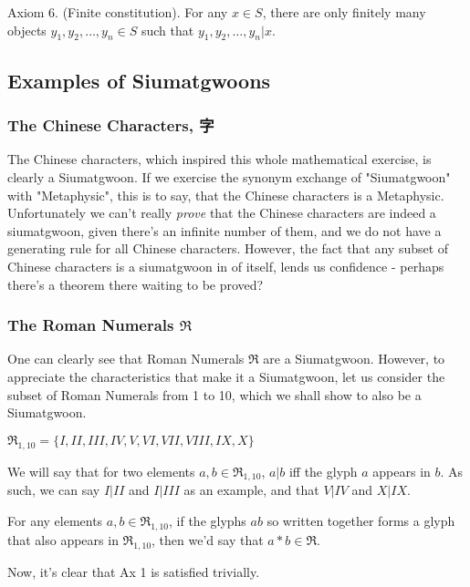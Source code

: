 \begin{axiom}\label{ax:finite}
Axiom 6. (Finite constitution). For any $x \in S$, there are only finitely many objects $y_1, y_2, \ldots, y_n \in S$ such that $y_1, y_2, \ldots, y_n | x$.
\end{axiom}

\subsection{Examples of Siumatgwoons}

\subsubsection{The Chinese Characters, 字}

The Chinese characters, which inspired this whole mathematical exercise, is clearly a Siumatgwoon. If we exercise the synonym exchange of "Siumatgwoon" with "Metaphysic", this is to say, that the Chinese characters is a Metaphysic. Unfortunately we can't really \textit{prove} that the Chinese characters are indeed a siumatgwoon, given there's an infinite number of them, and we do not have a generating rule for all Chinese characters. However, the fact that any subset of Chinese characters is a siumatgwoon in of itself, lends us confidence - perhaps there's a theorem there waiting to be proved?

\subsubsection{The Roman Numerals $\mathfrak{R}$}

One can clearly see that Roman Numerals $\mathfrak{R}$ are a Siumatgwoon. However, to appreciate the characteristics that make it a Siumatgwoon, let us consider the subset of Roman Numerals from 1 to 10, which we shall show to also be a Siumatgwoon.

$\mathfrak{R}_{1,10} = \{I, II, III, IV, V, VI, VII, VIII, IX, X\}$

We will say that for two elements $a,b \in \mathfrak{R}_{1,10}$, $a|b$ iff the glyph $a$ appears in $b$. As such, we can say $I | II$ and $I|III$ as an example, and that $V|IV$ and $X|IX$. 

For any elements $a,b\in \mathfrak{R}_{1,10}$, if the glyphs $ab$ so written together forms a glyph that also appears in $\mathfrak{R}_{1,10}$, then we'd say that $a*b\in \mathfrak{R}$.

Now, it's clear that Ax 1 is satisfied trivially. 

